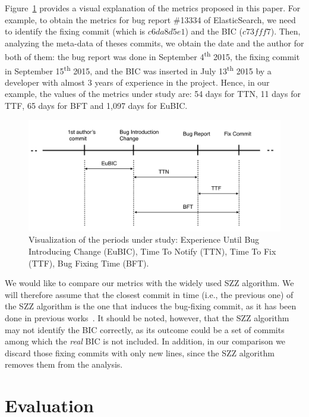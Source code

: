 \documentclass[10pt, conference]{IEEEtran}
\begin{document}
Figure~\ref{fig:metrics} provides a visual explanation of the metrics proposed in this paper. For example, to obtain the metrics for bug report \#13334 of ElasticSearch, we need to identify the fixing commit (which is $c6da8d5e1$) and the BIC ($c73fff7$). Then, analyzing the meta-data of theses commits, we obtain the date and the author for both of them: the bug report was done in September 4\textsuperscript{th} 2015, the fixing commit in  September 15\textsuperscript{th} 2015, and the BIC was inserted in July 13\textsuperscript{th}  2015 by a developer with almost 3 years of experience in the project. Hence, in our example, the values of the metrics under study are: 54 days for TTN, 11 days for TTF, 65 days for BFT and 1,097 days for EuBIC.
\begin{figure}[ht]
\centering
\includegraphics[width=\columnwidth]{metrics.png}
\caption{Visualization of the periods under study: Experience Until Bug Introducing Change (EuBIC),  Time To Notify (TTN), Time To Fix (TTF), Bug Fixing Time (BFT).}
\label{fig:metrics}       %
\end{figure}

We would like to compare our metrics with the widely used SZZ algorithm. We will therefore assume that the closest commit in time (i.e., the previous one) of the SZZ algorithm is the one that induces the bug-fixing commit, as it has been done in previous works~\cite{eyolfson2011time}. It should be noted, however, that the SZZ algorithm may not identify the BIC correctly, as its outcome could be a set of commits among which the \emph{real} BIC is not included. In addition, in our comparison we discard those fixing commits with only new lines, since the SZZ algorithm removes them from the analysis.


\section{Evaluation}
\label{sec:evaluation}
\end{document}
